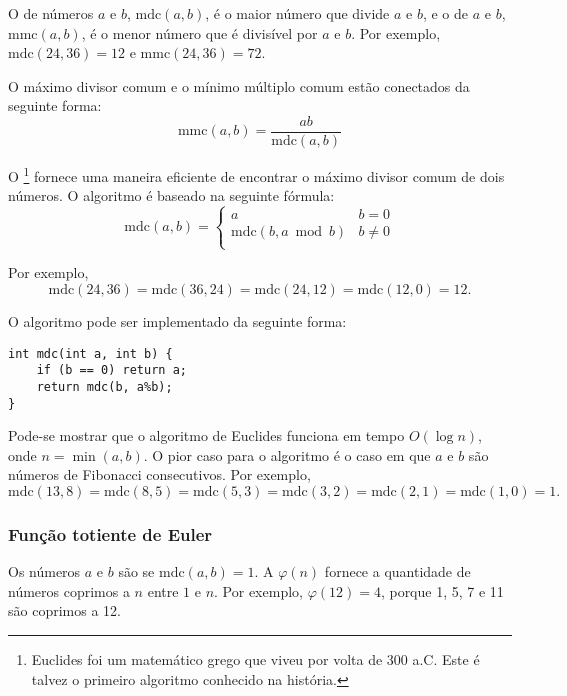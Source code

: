 
O  de números $a$ e $b$, $\textrm{mdc}(a,b)$, é o maior número que divide $a$ e $b$, e o  de $a$ e $b$, $\textrm{mmc}(a,b)$, é o menor número que é divisível por $a$ e $b$. Por exemplo, $\textrm{mdc}(24,36)=12$ e $\textrm{mmc}(24,36)=72$.

O máximo divisor comum e o mínimo múltiplo comum estão conectados da seguinte forma:
\[\textrm{mmc}(a,b)=\frac{ab}{\textrm{mdc}(a,b)}\]

O \footnote{Euclides foi um matemático grego que viveu por volta de 300 a.C. Este é talvez o primeiro algoritmo conhecido na história.} fornece uma maneira eficiente de encontrar o máximo divisor comum de dois números. O algoritmo é baseado na seguinte fórmula:
\begin{equation*}
    \textrm{mdc}(a,b) = \begin{cases}
               a        & b = 0\\
               \textrm{mdc}(b,a \bmod b) & b \neq 0\\
           \end{cases}
\end{equation*}

Por exemplo,
\[\textrm{mdc}(24,36) = \textrm{mdc}(36,24)
= \textrm{mdc}(24,12) = \textrm{mdc}(12,0)=12.\]

O algoritmo pode ser implementado da seguinte forma:
\begin{lstlisting}
int mdc(int a, int b) {
    if (b == 0) return a;
    return mdc(b, a%b);
}
\end{lstlisting}

Pode-se mostrar que o algoritmo de Euclides funciona em tempo $O(\log n)$, onde $n=\min(a,b)$. O pior caso para o algoritmo é o caso em que $a$ e $b$ são números de Fibonacci consecutivos. Por exemplo,
\[\textrm{mdc}(13,8)=\textrm{mdc}(8,5)
=\textrm{mdc}(5,3)=\textrm{mdc}(3,2)=\textrm{mdc}(2,1)=\textrm{mdc}(1,0)=1.\]

\subsubsection{Função totiente de Euler}


Os números $a$ e $b$ são  se $\textrm{mdc}(a,b)=1$. A  $\varphi(n)$
fornece a quantidade de números coprimos a $n$ entre $1$ e $n$. Por exemplo, $\varphi(12)=4$, porque 1, 5, 7 e 11 são coprimos a 12.

